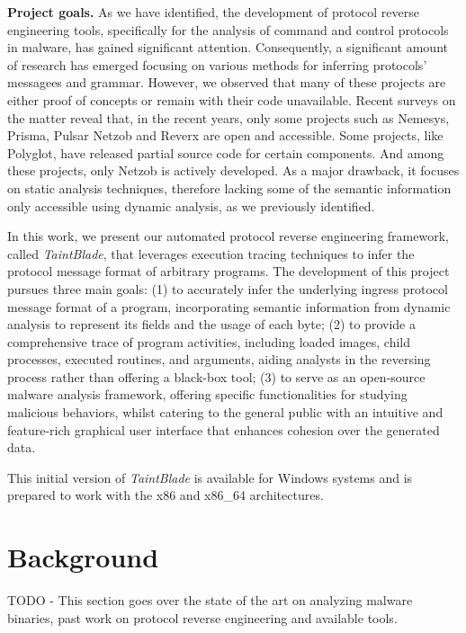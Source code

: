 \documentclass[conference]{IEEEtran}
\begin{document}
\textbf{Project goals.}
As we have identified, the development of
protocol reverse engineering tools, specifically for the analysis of command and control protocols in malware, has gained significant attention.
Consequently, a significant amount of research has emerged focusing on various methods for inferring protocols' messagees and grammar.
However, we observed that many of these projects are either proof of concepts
or remain with their code unavailable. Recent
surveys on the matter\cite{apre_survey}\cite{apre_survey2} reveal that, in the recent years, only some projects such as Nemesys\cite{github_pre_nemesys}, Prisma\cite{github_pre_prisam}, Pulsar\cite{github_pre_pulsar}
Netzob\cite{github_pre_netzob} and Reverx\cite{github_pre_reverx} are open and accessible.
Some projects, like Polyglot\cite{polyglot_caballero}, have released partial source code for certain components.
And among these projects, only Netzob is actively developed. As a major drawback, it focuses on static analysis techniques, therefore lacking some of the semantic information
only accessible using dynamic analysis, as we previously identified.

In this work, we present our automated protocol reverse engineering framework,
called \textit{TaintBlade}, that leverages execution tracing techniques to
infer the protocol message format of arbitrary programs. The development of
this project pursues three main goals: (1) to accurately infer the underlying
ingress protocol message format of a program, incorporating semantic
information from dynamic analysis to represent its fields and the usage of each
byte; (2) to provide a comprehensive trace of program activities, including
loaded images, child processes, executed routines, and arguments, aiding
analysts in the reversing process rather than offering a black-box tool; (3) to
serve as an open-source malware analysis framework, offering specific
functionalities for studying malicious behaviors, whilst catering to the
general public with an intuitive and feature-rich graphical user interface that
enhances cohesion over the generated data.

This initial version of \textit{TaintBlade} is available for Windows systems
and is prepared to work with the x86 and x86\_64 architectures.

\section{Background}
TODO - This section goes over the state of the art on analyzing malware
binaries, past work on protocol reverse engineering and available tools.
\end{document}
